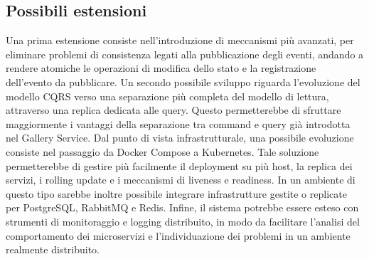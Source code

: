 \documentclass[conference]{IEEEtran}
\begin{document}
\subsection{Possibili estensioni}
Una prima estensione consiste nell'introduzione di meccanismi più avanzati, per eliminare problemi di consistenza legati alla pubblicazione degli eventi, andando a rendere atomiche le operazioni di modifica dello stato e la registrazione dell'evento da pubblicare. Un secondo possibile sviluppo riguarda l'evoluzione del modello CQRS verso una separazione più completa del modello di lettura, attraverso una replica dedicata alle query. Questo permetterebbe di sfruttare maggiormente i vantaggi della separazione tra command e query già introdotta nel Gallery Service. Dal punto di vista infrastrutturale, una possibile evoluzione consiste nel passaggio da Docker Compose a Kubernetes. Tale soluzione permetterebbe di gestire più facilmente il deployment su più host, la replica dei servizi, i rolling update e i meccanismi di liveness e readiness. In un ambiente di questo tipo sarebbe inoltre possibile integrare infrastrutture gestite o replicate per PostgreSQL, RabbitMQ e Redis. Infine, il sistema potrebbe essere esteso con strumenti di monitoraggio e logging distribuito, in modo da facilitare l'analisi del comportamento dei microservizi e l'individuazione dei problemi in un ambiente realmente distribuito.
\end{document}
